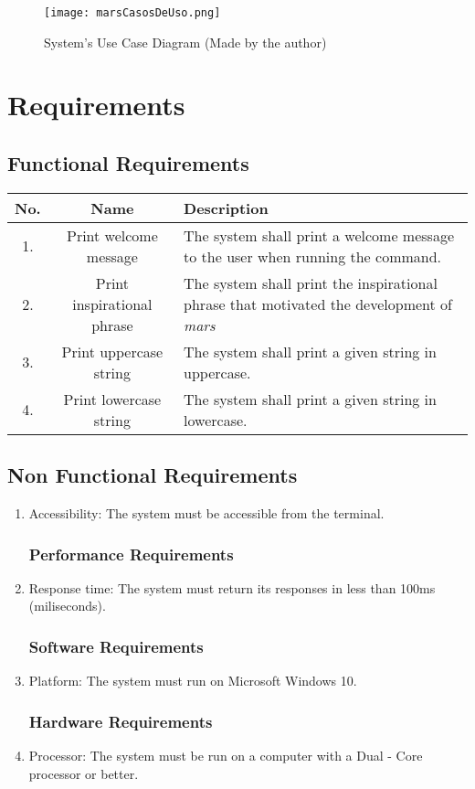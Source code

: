 \documentclass{report}
\begin{document}
\begin{figure}[h]
\centering
\texttt{[image: marsCasosDeUso.png]}
\caption{System's Use Case Diagram (Made by the author\cite{githubinc.MariolfhOverview2025})}
\label{fig:UCD}
\end{figure}

\chapter{Requirements}
\section{Functional Requirements}
\begin{center}
\begin{tabular}{ || c | c | p{7cm} ||}
\hline
No. & Name & Description \\
\hline
1. & Print welcome message & The system shall print a welcome message to the user when running the command. \\
\hline
2. & Print inspirational phrase & The system shall print the inspirational phrase that motivated the development of \emph{mars} \\
\hline
3. & Print uppercase string & The system shall print a given string in uppercase. \\
\hline
4. & Print lowercase string & The system shall print a given string in lowercase. \\
\hline
\end{tabular}
\end{center}
\section{Non Functional Requirements}
\begin{enumerate}
\subsection{Usability Requirements}
\item{Accessibility: The system must be accessible from the terminal.}
\subsection{Performance Requirements}
\item{Response time: The system must return its responses in less than 100ms (miliseconds).}
\subsection{Software Requirements}
\item{Platform: The system must run on Microsoft Windows 10.}
\subsection{Hardware Requirements}
\item{Processor: The system must be run on a computer with a Dual - Core processor or better.}
\end{enumerate}
\end{document}
